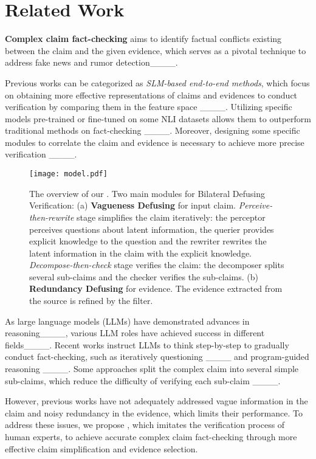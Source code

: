 \section{Related Work}
\textbf{Complex claim fact-checking} aims to identify factual conflicts existing between the claim and the given evidence, which serves as a pivotal technique to address fake news and rumor detection____.

Previous works can be categorized as \textit{SLM-based end-to-end methods}, which focus on obtaining more effective representations of claims and evidences to conduct verification by comparing them in the feature space ____. 
Utilizing specific models pre-trained or fine-tuned on some NLI datasets allows them to outperform traditional methods on fact-checking ____. Moreover, designing some specific modules to correlate the claim and evidence is necessary to achieve more precise verification ____. 

\begin{figure*}
\centering
\texttt{[image: model.pdf]}
\caption{The overview of our \model. Two main modules for Bilateral Defusing Verification: (a) \textbf{Vagueness Defusing} for input claim. \textit{Perceive-then-rewrite} stage simplifies the claim iteratively: the perceptor perceives questions about latent information, the querier provides explicit knowledge to the question and the rewriter rewrites the latent information in the claim with the explicit knowledge. \textit{Decompose-then-check} stage verifies the claim: the decomposer splits several sub-claims and the checker verifies the sub-claims. (b) \textbf{Redundancy Defusing} for evidence. The evidence extracted from the source is refined by the filter.}
\label{fig:model}
\end{figure*}

As large language models (LLMs) have demonstrated advances in reasoning____, various LLM roles have achieved success in different fields____.
Recent works instruct LLMs to think step-by-step to gradually conduct fact-checking, such as iteratively questioning ____ and program-guided reasoning ____. Some approaches split the complex claim into several simple sub-claims, which reduce the difficulty of verifying each sub-claim ____.

However, previous works have not adequately addressed vague information in the claim and noisy redundancy in the evidence, which limits their performance. To address these issues, we propose \model, which imitates the verification process of human experts, to achieve accurate complex claim fact-checking through more effective claim simplification and evidence selection.
